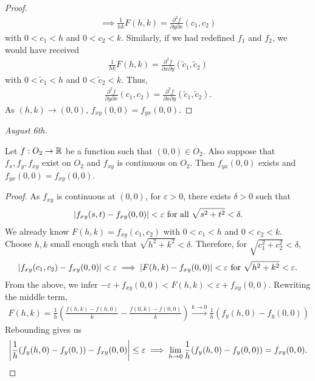 \begin{proof}
\begin{align}
        \implies \frac{1}{hk} F(h,k) = \frac{\partial^{2} f}{\partial y \partial x} (c_{1},c_{2})
    \end{align}
    with $0 < c_{1} < h$ and $0 < c_{2} < k$. Similarly, if we had redefined $f_{1}$ and $f_{2}$, we would have received
    \begin{align}
        \frac{1}{hk} F(h,k) = \frac{\partial^{2} f}{\partial x \partial y} (\tilde{c}_{1},\tilde{c}_{2})
    \end{align}
    with $0 < \tilde{c}_{1} < h$ and $0 < \tilde{c}_{2} < k$. Thus,
    \begin{align}
        \frac{\partial^{2} f}{\partial y \partial x} (c_{1},c_{2}) = \frac{\partial^{2} f}{\partial x \partial y} (\tilde{c}_{1},\tilde{c}_{2}).
    \end{align}
    As $(h,k) \to (0,0)$, $f_{xy}(0,0) = f_{yx}(0,0)$.
\end{proof}

\noindent \textit{August 6th.}

\begin{theorem}
    Let $f:O_{2} \to \mathbb{R}$ be a function such that $(0,0) \in O_{2}$. Also suppose that $f_{x},f_{y},f_{xy}$ exist on $O_{2}$ and $f_{xy}$ is continuous on $O_{2}$. Then $f_{yx}(0,0)$ exists and $f_{yx}(0,0) = f_{xy}(0,0)$.
\end{theorem}

\begin{proof}
    As $f_{xy}$ is continuous at $(0,0)$, for $\varepsilon > 0$, there exists $\delta > 0$ such that
    \begin{align}
        \left| f_{xy}(s,t) - f_{xy}(0,0) \right| < \varepsilon \text{ for all } \sqrt{s^{2}+t^{2}} < \delta.
    \end{align}
    We already know $F(h,k) = f_{xy}(c_{1},c_{2})$ with $0 < c_{1} < h$ and $0 < c_{2} < k$. Choose $h,k$ small enough such that $\sqrt{h^{2}+k^{2}} < \delta$. Therefore, for $\sqrt{c_{1}^{2} + c_{2}^{2}} < \delta$,
    \begin{align}
        \left| f_{xy}(c_{1},c_{2})-f_{xy}(0,0) \right| < \varepsilon \implies \left| F(h,k) - f_{xy}(0,0) \right| < \varepsilon \text{ for } \sqrt{h^{2}+k^{2}} < \varepsilon.
    \end{align}
    From the above, we infer $-\varepsilon+f_{xy}(0,0) < F(h,k) < \varepsilon + f_{xy}(0,0)$. Rewriting the middle term,
    \begin{align}
        F(h,k) = \frac{1}{h} \left( \frac{f(h,k)-f(h,0)}{k} - \frac{f(0,k)-f(0,0)}{k} \right) \xrightarrow{k \to 0} \frac{1}{h} (f_{y}(h,0)-f_{y}(0,0))
    \end{align}
    Rebounding gives us
    \begin{align}
        \left| \frac{1}{h}(f_{y}(h,0)-f_{y}(0,)) - f_{xy}(0,0) \right| \leq \varepsilon \implies \lim_{h \to 0} \frac{1}{h} (f_{y}(h,0)-f_{y}(0,0)) = f_{xy}(0,0).
    \end{align}
\end{proof}

